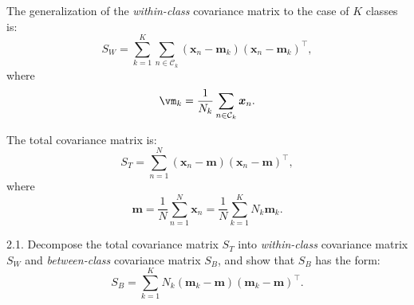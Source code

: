 \documentclass[openany]{ctexbook}
\theoremstyle{kaiti}
\theoremstyle{normal}
\begin{document}
The generalization of the \emph{within-class} covariance matrix to the case of $K$ classes is:
\begin{equation}
  S_{W}=\sum_{k=1}^{K}\sum_{n\in \mathcal{C}_{k}}(\bm{x}_{n}-\bm{m}_{k})(\bm{x}_{n}-\bm{m}_{k})^{\top},
\end{equation}
where
\begin{equation}
  \vm_k=\frac{1}{N_{k}}\sum_{n\in \mathcal{C}_{k}}\bm{x}_{n}.
\end{equation}

The total covariance matrix is:
\begin{equation}
  S_{T}=\sum_{n=1}^{N}(\bm{x}_{n}-\bm{m})(\bm{x}_{n}-\bm{m})^{\top},
\end{equation}
where
\begin{equation}
  \bm{m}=\frac{1}{N}\sum_{n=1}^{N}\bm{x}_{n}=\frac{1}{N}\sum_{k=1}^{K}N_{k}\bm{m}_{k}.
\end{equation}


2.1. Decompose the total covariance matrix $S_{T}$ into \emph{within-class} covariance matrix $S_{W}$ and \emph{between-class} covariance matrix $S_{B}$, and show that $S_{B}$ has the form:
\begin{equation}
  S_{B}=\sum_{k=1}^{K}N_{k}(\bm{m}_{k}-\bm{m})(\bm{m}_{k}-\bm{m})^{\top}.
\end{equation}
\end{document}
